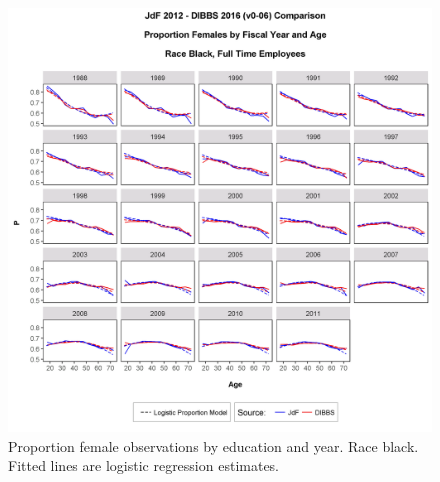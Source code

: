 \documentclass[10pt, letterpaper]{article}
\begin{document}
\begin{spacing}{1.0}
\begin{figure}[]
    \centering
    \includegraphics[width=6.5in, trim={0 0 0 1in}, clip]{GenderProportionLogisticModelFYRaceAgeCv0-06.png}
    \caption{Proportion female observations by education and year.  Race black.  Fitted lines are logistic regression estimates.}
    \label{figure:GenderProportionLogisticModelFYRaceAgeC}
\end{figure}

\clearpage


\end{spacing}
\end{document}
